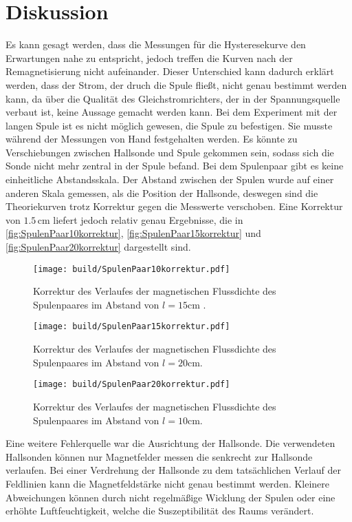 \section{Diskussion}
\label{sec:Diskussion}
Es kann gesagt werden, dass die Messungen für die Hysteresekurve den Erwartungen nahe zu entspricht, jedoch treffen die Kurven nach der Remagnetisierung nicht aufeinander. 
Dieser Unterschied kann dadurch erklärt werden, dass der Strom, der druch die Spule fließt, nicht genau bestimmt werden kann, da über die Qualität des Gleichstromrichters,
 der in der Spannungsquelle verbaut ist, keine Aussage gemacht werden kann.
Bei dem Experiment mit der langen Spule ist es nicht möglich gewesen, die Spule zu befestigen. 
Sie musste während der Messungen von Hand festgehalten werden. 
Es könnte zu Verschiebungen zwischen Hallsonde und Spule gekommen sein, sodass sich die Sonde nicht mehr zentral in der Spule befand.
Bei dem Spulenpaar gibt es keine einheitliche Abstandsskala.
Der Abstand zwischen der Spulen wurde auf einer anderen Skala gemessen, als die Position der Hallsonde, deswegen sind die Theoriekurven trotz Korrektur gegen die Messwerte verschoben.
Eine Korrektur von  $1.5 \, \unit{\centi\meter}$ liefert jedoch relativ genau Ergebnisse, die in \autoref{fig:SpulenPaar10korrektur}, \autoref{fig:SpulenPaar15korrektur} und \autoref{fig:SpulenPaar20korrektur}
dargestellt sind.

\begin{figure}[H]
    \centering
    \texttt{[image: build/SpulenPaar10korrektur.pdf]}
    \caption{Korrektur des Verlaufes der magnetischen Flussdichte des Spulenpaares im Abstand von $l = 15 \unit{\centi\meter}$ .}
    \label{fig:SpulenPaar10korrektur}
  \end{figure}

  \begin{figure}[H]
    \centering
    \texttt{[image: build/SpulenPaar15korrektur.pdf]}
    \caption{Korrektur des Verlaufes der magnetischen Flussdichte des Spulenpaares im Abstand von $l = 20 \unit{\centi\meter}$.}
    \label{fig:SpulenPaar15korrektur}
  \end{figure}

  \begin{figure}[H]
    \centering
    \texttt{[image: build/SpulenPaar20korrektur.pdf]}
    \caption{Korrektur des Verlaufes der magnetischen Flussdichte des Spulenpaares im Abstand von $l = 10 \unit{\centi\meter}$.}
    \label{fig:SpulenPaar20korrektur}
  \end{figure}

  Eine weitere Fehlerquelle war die Ausrichtung der Hallsonde. Die verwendeten Hallsonden können nur Magnetfelder messen die senkrecht zur Hallsonde verlaufen. Bei einer Verdrehung der Hallsonde zu dem tatsächlichen Verlauf der Feldlinien kann die Magnetfeldstärke nicht genau bestimmt werden. Kleinere Abweichungen können durch nicht regelmäßige Wicklung der Spulen oder eine erhöhte Luftfeuchtigkeit, welche die Suszeptibilität des Raums verändert.